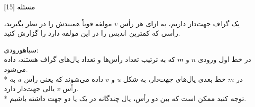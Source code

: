 ‌مسئله [15]


% 
%
%
% 
یک گراف جهت‌دار داریم، به ازای هر رأس $v$ مولفه قویاً همبندش را در نظر بگیرید، رأسی که کمترین اندیس را در این مولفه دارد را گزارش کنید.

\noindent
{}‌سیاه{ورودی:}\\
در خط اول ورودی $n$ و $m$ که به ترتیب تعداد رأس‌ها و تعداد یال‌های گراف هستند، داده می‌شود.\\*
در $m$ خط بعدی یال‌های جهت‌دار، به شکل $u$ و $v$ داده می‌شوند که یعنی رأس $u$ به رأس $v$ یالی جهت‌دار دارد.\\*
توجه کنید ممکن است که بین دو رأس، یال چندگانه در یک یا دو جهت داشته باشیم.

